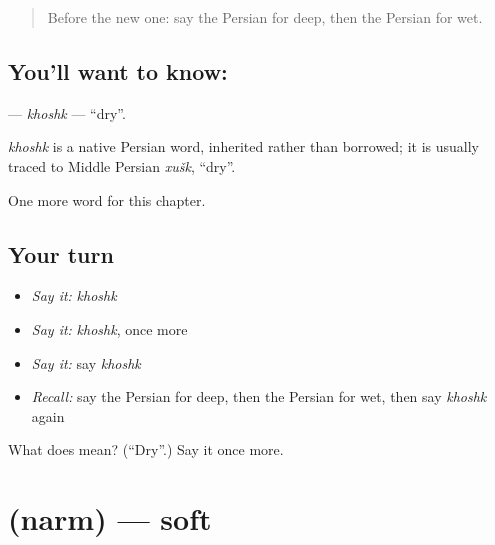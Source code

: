 \label{lesson:FA-C124-khoshk}



\begin{quote}
Before the new one: say the Persian for deep, then the Persian for wet.
\end{quote}

\subsection*{You'll want to know: }
\textbf{} — \emph{khoshk} — \textquotedblleft{}dry\textquotedblright{}.

\begin{cousinweb}
\emph{khoshk} is a native Persian word, inherited rather than borrowed; it is usually traced to Middle Persian \emph{xušk}, \textquotedblleft{}dry\textquotedblright{}.
\end{cousinweb}

\begin{grammarlens}[title={What you've built}]
One more word for this chapter.
\end{grammarlens}

\subsection*{Your turn}
\begin{itemize}
\raggedright
  \item \emph{Say it:} \emph{khoshk}
  \item \emph{Say it:} \emph{khoshk}, once more
  \item \emph{Say it:} say \emph{khoshk}
  \item \emph{Recall:} say the Persian for deep, then the Persian for wet, then say \emph{khoshk} again
\end{itemize}

\begin{tcolorbox}[breakable,colback=teal!4,colframe=teal!35!black,title={Before you move on}]
What does  mean? (\textquotedblleft{}Dry\textquotedblright{}.) Say it once more.
\end{tcolorbox}
\section[\texorpdfstring{\fa{نرم} (narm)}{نرم (narm)}]{ (narm) — soft}

\label{lesson:FA-C124-narm}



